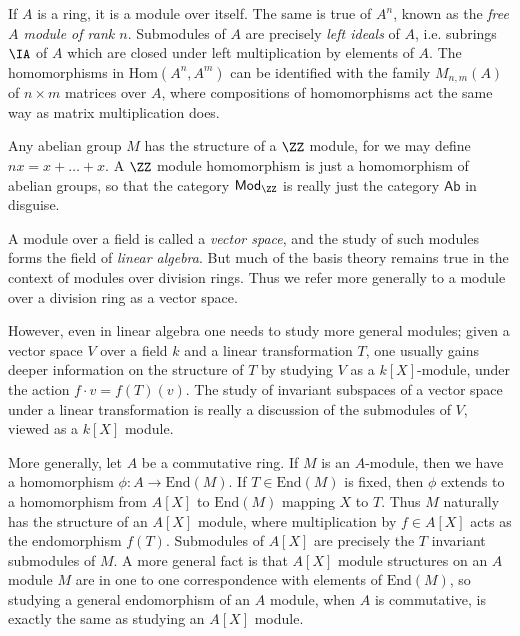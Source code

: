 \begin{example}
    If $A$ is a ring, it is a module over itself. The same is true of $A^n$, known as the \emph{free $A$ module of rank $n$}. Submodules of $A$ are precisely \emph{left ideals} of $A$, i.e. subrings $\IA$ of $A$ which are closed under left multiplication by elements of $A$. The homomorphisms in $\text{Hom}(A^n,A^m)$ can be identified with the family $M_{n,m}(A)$ of $n \times m$ matrices over $A$, where compositions of homomorphisms act the same way as matrix multiplication does.
\end{example}

\begin{example}
    Any abelian group $M$ has the structure of a $\ZZ$ module, for we may define $nx = x + \dots + x$. A $\ZZ$ module homomorphism is just a homomorphism of abelian groups, so that the category $\mathsf{Mod}_{\ZZ}$ is really just the category $\mathsf{Ab}$ in disguise.
\end{example}

\begin{example}
    A module over a field is called a \emph{vector space}, and the study of such modules forms the field of \emph{linear algebra}. But much of the basis theory remains true in the context of modules over division rings. Thus we refer more generally to a module over a division ring as a vector space.

    However, even in linear algebra one needs to study more general modules; given a vector space $V$ over a field $k$ and a linear transformation $T$, one usually gains deeper information on the structure of $T$ by studying $V$ as a $k[X]$-module, under the action $f \cdot v = f(T) (v)$. The study of invariant subspaces of a vector space under a linear transformation is really a discussion of the submodules of $V$, viewed as a $k[X]$ module.

    More generally, let $A$ be a commutative ring. If $M$ is an $A$-module, then we have a homomorphism $\phi: A \to \text{End}(M)$. If $T \in \text{End}(M)$ is fixed, then $\phi$ extends to a homomorphism from $A[X]$ to $\text{End}(M)$ mapping $X$ to $T$. Thus $M$ naturally has the structure of an $A[X]$ module, where multiplication by $f \in A[X]$ acts as the endomorphism $f(T)$. Submodules of $A[X]$ are precisely the $T$ invariant submodules of $M$. A more general fact is that $A[X]$ module structures on an $A$ module $M$ are in one to one correspondence with elements of $\text{End}(M)$, so studying a general endomorphism of an $A$ module, when $A$ is commutative, is exactly the same as studying an $A[X]$ module. 
\end{example}

